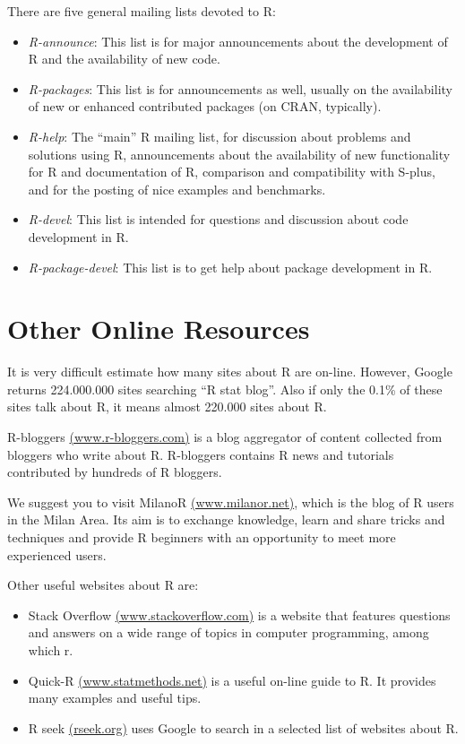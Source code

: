 \documentclass[]{book}
\providecommand{\tightlist}{%
  \setlength{\itemsep}{0pt}\setlength{\parskip}{0pt}}
\def\tightlist{}
\begin{document}
There are five general mailing lists devoted to R:

\begin{itemize}
\tightlist
\item
  \emph{R-announce}: This list is for major announcements about the
  development of R and the availability of new code.
\item
  \emph{R-packages}: This list is for announcements as well, usually on
  the availability of new or enhanced contributed packages (on CRAN,
  typically).
\item
  \emph{R-help}: The ``main'' R mailing list, for discussion about
  problems and solutions using R, announcements about the availability
  of new functionality for R and documentation of R, comparison and
  compatibility with S-plus, and for the posting of nice examples and
  benchmarks.
\item
  \emph{R-devel}: This list is intended for questions and discussion
  about code development in R.
\item
  \emph{R-package-devel}: This list is to get help about package
  development in R.
\end{itemize}

\section{Other Online Resources}\label{other-online-resources}

It is very difficult estimate how many sites about R are on-line.
However, Google returns 224.000.000 sites searching ``R stat blog''.
Also if only the 0.1\% of these sites talk about R, it means almost
220.000 sites about R.

R-bloggers \href{http://www.r-bloggers.com/}{(www.r-bloggers.com)} is a
blog aggregator of content collected from bloggers who write about R.
R-bloggers contains R news and tutorials contributed by hundreds of R
bloggers.

We suggest you to visit MilanoR
\href{http://www.milanor.net/}{(www.milanor.net)}, which is the blog of
R users in the Milan Area. Its aim is to exchange knowledge, learn and
share tricks and techniques and provide R beginners with an opportunity
to meet more experienced users.

Other useful websites about R are:

\begin{itemize}
\tightlist
\item
  Stack Overflow
  \href{http://stackoverflow.com/}{(www.stackoverflow.com)} is a website
  that features questions and answers on a wide range of topics in
  computer programming, among which r.
\item
  Quick-R \href{http://www.statmethods.net/}{(www.statmethods.net)} is a
  useful on-line guide to R. It provides many examples and useful tips.
\item
  R seek \href{http://rseek.org/}{(rseek.org)} uses Google to search in
  a selected list of websites about R.
\end{itemize}
\end{document}

